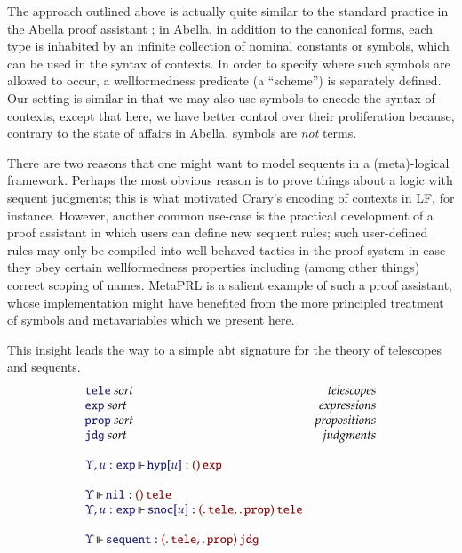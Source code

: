 \documentclass[11pt]{article}
\theoremstyle{definition}
\theoremstyle{remark}
\numberwithin{equation}{section}
\begin{document}
The approach outlined above is actually quite similar to the standard practice
in the Abella proof assistant \cite{gacek:2008}; in Abella, in addition to the
canonical forms, each type is inhabited by an infinite collection of nominal
constants or symbols, which can be used in the syntax of contexts. In order to
specify where such symbols are allowed to occur, a wellformedness predicate (a
``scheme'') is separately defined. Our setting is similar in that we may also
use symbols to encode the syntax of contexts, except that here, we have better
control over their proliferation because, contrary to the state of
affairs in Abella, symbols are \emph{not} terms.

There are two reasons that one might want to model sequents in a (meta)-logical
framework. Perhaps the most obvious reason is to prove things about a logic
with sequent judgments; this is what motivated Crary's encoding of contexts in
LF, for instance. However, another common use-case is the practical development
of a proof assistant in which users can define new sequent rules; such
user-defined rules may only be compiled into well-behaved tactics in the proof
system in case they obey certain wellformedness properties including (among
other things) correct scoping of names. MetaPRL is a salient example of such a
proof assistant, whose implementation might have benefited from the more
principled treatment of symbols and metavariables which we present here.

This insight leads the way to a simple abt signature for the theory of
telescopes and sequents.
%
\newcommand\SortTele{\mathtt{tele}}
\newcommand\SortJdg{\mathtt{jdg}}
\newcommand\SortProp{\mathtt{prop}}
\newcommand\SortExpr{\mathtt{exp}}
\newcommand\OpNil{\mathtt{nil}}
\newcommand\OpSnoc[1]{\mathtt{snoc}[#1]}
\newcommand\OpHyp[1]{\mathtt{hyp}[#1]}
\newcommand\OpSequent{\mathtt{sequent}}
\[
  \begin{array}{lr}
    \IsSort{\SortTele}&\textit{telescopes}\\
    \IsSort{\SortExpr}&\textit{expressions}\\
    \IsSort{\SortProp}&\textit{propositions}\\
    \IsSort{\SortJdg}&\textit{judgments}\\\\
    \IsOperator{\Upsilon, u:\SortExpr}{\OpHyp{u}}{
      \MkArity{}{\SortExpr}
    }\\\\
    \IsOperator{\Upsilon}{\OpNil}{
      \MkArity{}{\SortTele}
    }\\
    \IsOperator{\Upsilon, u:\SortExpr}{\OpSnoc{u}}{
      \MkArity{
        \MkValence{}{}{\SortTele},
        \MkValence{}{}{\SortProp}
      }{\SortTele}
    }\\\\
    \IsOperator{\Upsilon}{\OpSequent}{
      \MkArity{
        \MkValence{}{}{\SortTele},
        \MkValence{}{}{\SortProp}
      }{\SortJdg}
    }
  \end{array}
\]
\end{document}
